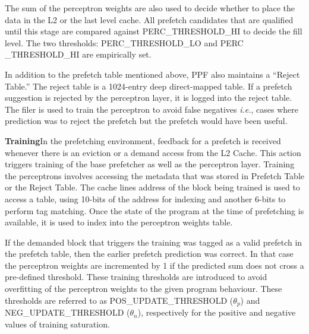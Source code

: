 The sum of the perceptron weights are also used to decide whether to
place the data in the L2 or the last level cache.  All prefetch
candidates that are qualified until this stage are compared against
PERC\_THRESHOLD\_HI to decide the fill level. The two thresholds:
PERC\_THRESHOLD\_LO and PERC \_THRESHOLD\_HI are empirically set.


In addition to the prefetch table mentioned above, PPF also maintains
a ``Reject Table.''  The reject table is a 1024-entry deep
direct-mapped table.  If a prefetch suggestion is rejected by the
perceptron layer, it is logged into the reject table.  The filer is
used to train the perceptron to %
avoid false negatives \textit{i.e.}, cases where prediction was to
reject the prefetch but the prefetch would have been useful.



\textbf{Training}\newline In the prefetching environment, feedback for
a prefetch is received whenever there is an eviction or a demand
access from the L2 Cache.  This action triggers training of the base
prefetcher as well as the perceptron layer.  Training the perceptrons
involves accessing the metadata that was stored in Prefetch Table or
the Reject Table.  The cache lines address of the block being trained
is used to access a table, using 10-bits of the address for indexing
and another 6-bits to perform tag matching.  Once the state of the
program at the time of prefetching is available, it is
used to index into the perceptron weights table.

If the demanded block that triggers the training was tagged as a valid
prefetch in the prefetch table, then the earlier prefetch prediction
was correct.  In that case the perceptron weights are incremented by 1
if the predicted sum does not cross a pre-defined threshold. These
training thresholds are introduced to avoid overfitting of the
perceptron weights to the given program behaviour. These thresholds
are referred to as POS\_UPDATE\_THRESHOLD ($\theta_p$) and
NEG\_UPDATE\_THRESHOLD ($\theta_n$), respectively for the positive and
negative values of training saturation.

